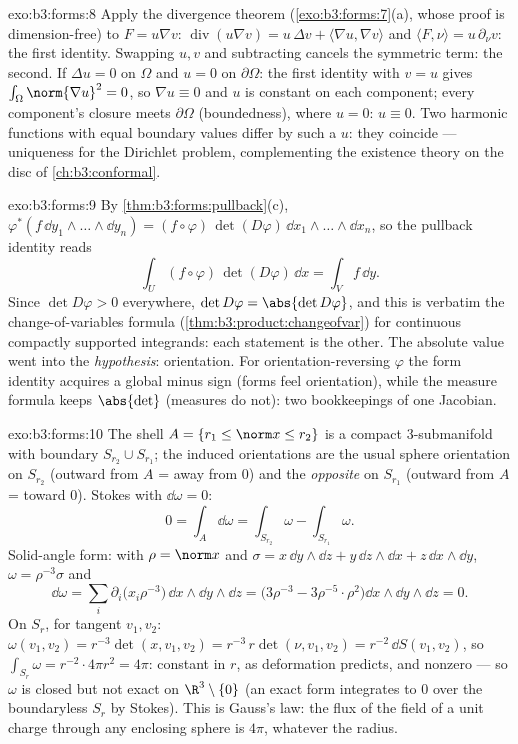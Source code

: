 \begin{solution}{exo:b3:forms:8}
Apply the divergence theorem (\cref{exo:b3:forms:7}(a),
whose proof is dimension-free) to $F = u\nabla v$:
$\operatorname{div}(u\nabla v) = u\,\Delta v + \langle\nabla
u, \nabla v\rangle$ and $\langle F, \nu\rangle =
u\,\partial_\nu v$: the first identity. Swapping $u, v$ and
subtracting cancels the symmetric term: the second. If
$\Delta u = 0$ on $\Omega$ and $u = 0$ on $\partial\Omega$:
the first identity with $v = u$ gives
$\int_\Omega\norm{\nabla u}^2 = 0$, so $\nabla u \equiv 0$
and $u$ is constant on each component; every component's
closure meets $\partial\Omega$ (boundedness), where $u = 0$:
$u \equiv 0$. Two harmonic functions with equal boundary
values differ by such a $u$: they coincide --- uniqueness
for the Dirichlet problem, complementing the existence
theory on the disc of \cref{ch:b3:conformal}.
\end{solution}

\begin{solution}{exo:b3:forms:9}
By \cref{thm:b3:forms:pullback}(c),
$\varphi^*(f\,\dd y_1\wedge\dots\wedge\dd y_n) =
(f\circ\varphi)\,\det(D\varphi)\,\dd
x_1\wedge\dots\wedge\dd x_n$, so the pullback identity reads
\[
\int_U(f\circ\varphi)\,\det(D\varphi)\,\dd x = \int_Vf\,\dd
y .
\]
Since $\det D\varphi > 0$ everywhere, $\det D\varphi =
\abs{\det D\varphi}$, and this is verbatim the
change-of-variables formula
(\cref{thm:b3:product:changeofvar}) for continuous
compactly supported integrands: each statement is the
other. The absolute value went into the \emph{hypothesis}:
orientation. For orientation-reversing $\varphi$ the form
identity acquires a global minus sign (forms feel
orientation), while the measure formula keeps $\abs{\det}$
(measures do not): two bookkeepings of one Jacobian.
\end{solution}

\begin{solution}{exo:b3:forms:10}
The shell $A = \{r_1 \leq \norm x \leq r_2\}$ is a compact
$3$-submanifold with boundary $S_{r_2}\cup S_{r_1}$; the
induced orientations are the usual sphere orientation on
$S_{r_2}$ (outward from $A$ = away from $0$) and the
\emph{opposite} on $S_{r_1}$ (outward from $A$ = toward
$0$). Stokes with $\dd\omega = 0$:
\[
0 = \int_A\dd\omega = \int_{S_{r_2}}\omega -
\int_{S_{r_1}}\omega .
\]
Solid-angle form: with $\rho = \norm x$ and $\sigma =
x\,\dd y\wedge\dd z + y\,\dd z\wedge\dd x + z\,\dd
x\wedge\dd y$, $\omega = \rho^{-3}\sigma$ and
\[
\dd\omega = \sum_i\partial_i\bigl(x_i\rho^{-3}\bigr)\,
\dd x\wedge\dd y\wedge\dd z
= \bigl(3\rho^{-3} - 3\rho^{-5}\cdot\rho^2\bigr)\dd
x\wedge\dd y\wedge\dd z = 0 .
\]
On $S_r$, for tangent $v_1, v_2$: $\omega(v_1, v_2) =
r^{-3}\det(x, v_1, v_2) = r^{-3}\,r\det(\nu, v_1, v_2) =
r^{-2}\,\dd S(v_1, v_2)$, so $\int_{S_r}\omega =
r^{-2}\cdot4\pi r^2 = 4\pi$: constant in $r$, as deformation
predicts, and nonzero --- so $\omega$ is closed but not
exact on $\R^3\setminus\{0\}$ (an exact form integrates to
$0$ over the boundaryless $S_r$ by Stokes). This is Gauss's
law: the flux of the field of a unit charge through any
enclosing sphere is $4\pi$, whatever the radius.
\end{solution}

